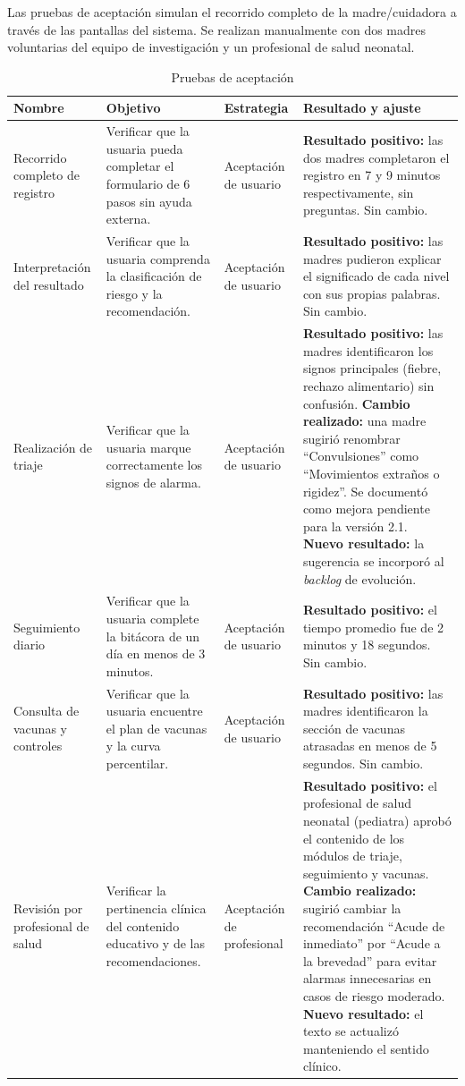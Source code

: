 \documentclass[12pt,letterpaper]{article}
\begin{document}
Las pruebas de aceptación simulan el recorrido completo de la madre/cuidadora a través de las pantallas del sistema. Se realizan manualmente con dos madres voluntarias del equipo de investigación y un profesional de salud neonatal.

\begin{longtable}{p{}p{}p{}p{}}
\caption{Pruebas de aceptación}\\\toprule
\textbf{Nombre} & \textbf{Objetivo} & \textbf{Estrategia} & \textbf{Resultado y ajuste} \\\midrule
\endhead
Recorrido completo de registro & Verificar que la usuaria pueda completar el formulario de 6 pasos sin ayuda externa. & Aceptación de usuario & \textbf{Resultado positivo:} las dos madres completaron el registro en 7 y 9 minutos respectivamente, sin preguntas. Sin cambio.\\\hline
Interpretación del resultado & Verificar que la usuaria comprenda la clasificación de riesgo y la recomendación. & Aceptación de usuario & \textbf{Resultado positivo:} las madres pudieron explicar el significado de cada nivel con sus propias palabras. Sin cambio.\\\hline
Realización de triaje & Verificar que la usuaria marque correctamente los signos de alarma. & Aceptación de usuario & \textbf{Resultado positivo:} las madres identificaron los signos principales (fiebre, rechazo alimentario) sin confusión. \textbf{Cambio realizado:} una madre sugirió renombrar ``Convulsiones'' como ``Movimientos extraños o rigidez''. Se documentó como mejora pendiente para la versión 2.1. \textbf{Nuevo resultado:} la sugerencia se incorporó al \textit{backlog} de evolución.\\\hline
Seguimiento diario & Verificar que la usuaria complete la bitácora de un día en menos de 3 minutos. & Aceptación de usuario & \textbf{Resultado positivo:} el tiempo promedio fue de 2 minutos y 18 segundos. Sin cambio.\\\hline
Consulta de vacunas y controles & Verificar que la usuaria encuentre el plan de vacunas y la curva percentilar. & Aceptación de usuario & \textbf{Resultado positivo:} las madres identificaron la sección de vacunas atrasadas en menos de 5 segundos. Sin cambio.\\\hline
Revisión por profesional de salud & Verificar la pertinencia clínica del contenido educativo y de las recomendaciones. & Aceptación de profesional & \textbf{Resultado positivo:} el profesional de salud neonatal (pediatra) aprobó el contenido de los módulos de triaje, seguimiento y vacunas. \textbf{Cambio realizado:} sugirió cambiar la recomendación ``Acude de inmediato'' por ``Acude a la brevedad'' para evitar alarmas innecesarias en casos de riesgo moderado. \textbf{Nuevo resultado:} el texto se actualizó manteniendo el sentido clínico.\\\bottomrule
\end{longtable}
\end{document}
